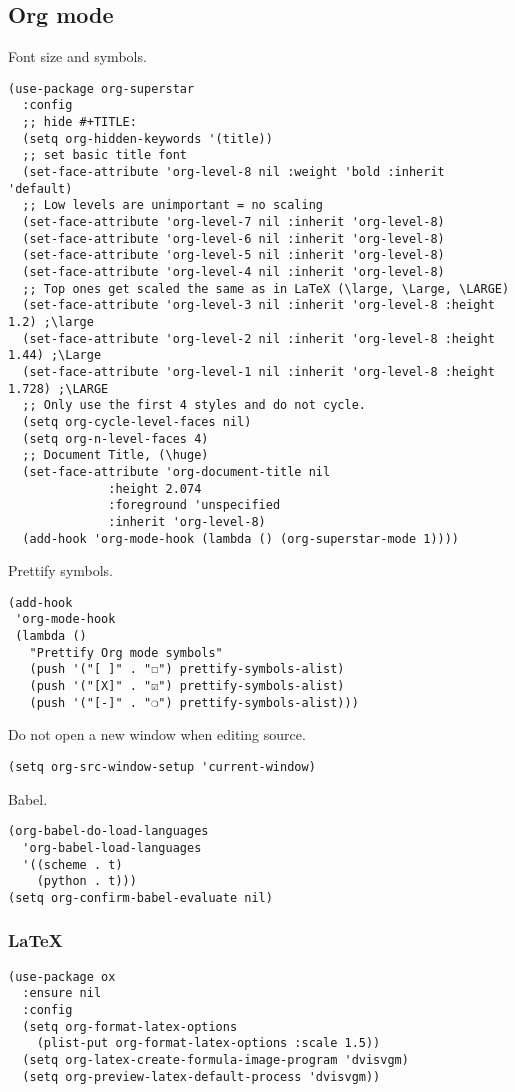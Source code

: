 \documentclass[11pt]{article}
\begin{document}
\subsection{Org mode}
\label{sec:orgaad49cf}
Font size and symbols.
\begin{verbatim}
(use-package org-superstar
  :config
  ;; hide #+TITLE:
  (setq org-hidden-keywords '(title))
  ;; set basic title font
  (set-face-attribute 'org-level-8 nil :weight 'bold :inherit 'default)
  ;; Low levels are unimportant = no scaling
  (set-face-attribute 'org-level-7 nil :inherit 'org-level-8)
  (set-face-attribute 'org-level-6 nil :inherit 'org-level-8)
  (set-face-attribute 'org-level-5 nil :inherit 'org-level-8)
  (set-face-attribute 'org-level-4 nil :inherit 'org-level-8)
  ;; Top ones get scaled the same as in LaTeX (\large, \Large, \LARGE)
  (set-face-attribute 'org-level-3 nil :inherit 'org-level-8 :height 1.2) ;\large
  (set-face-attribute 'org-level-2 nil :inherit 'org-level-8 :height 1.44) ;\Large
  (set-face-attribute 'org-level-1 nil :inherit 'org-level-8 :height 1.728) ;\LARGE
  ;; Only use the first 4 styles and do not cycle.
  (setq org-cycle-level-faces nil)
  (setq org-n-level-faces 4)
  ;; Document Title, (\huge)
  (set-face-attribute 'org-document-title nil
		      :height 2.074
		      :foreground 'unspecified
		      :inherit 'org-level-8)
  (add-hook 'org-mode-hook (lambda () (org-superstar-mode 1))))
\end{verbatim}

Prettify symbols.
\begin{verbatim}
(add-hook
 'org-mode-hook
 (lambda ()
   "Prettify Org mode symbols"
   (push '("[ ]" . "☐") prettify-symbols-alist)
   (push '("[X]" . "☑") prettify-symbols-alist)
   (push '("[-]" . "❍") prettify-symbols-alist)))
\end{verbatim}

Do not open a new window when editing source.
\begin{verbatim}
(setq org-src-window-setup 'current-window)
\end{verbatim}

Babel.
\begin{verbatim}
(org-babel-do-load-languages
  'org-babel-load-languages
  '((scheme . t)
    (python . t)))
(setq org-confirm-babel-evaluate nil)
\end{verbatim}

\subsubsection{\LaTeX{}}
\label{sec:orgea459ef}
\begin{verbatim}
(use-package ox
  :ensure nil
  :config
  (setq org-format-latex-options
	(plist-put org-format-latex-options :scale 1.5))
  (setq org-latex-create-formula-image-program 'dvisvgm)
  (setq org-preview-latex-default-process 'dvisvgm))
\end{verbatim}
\end{document}
